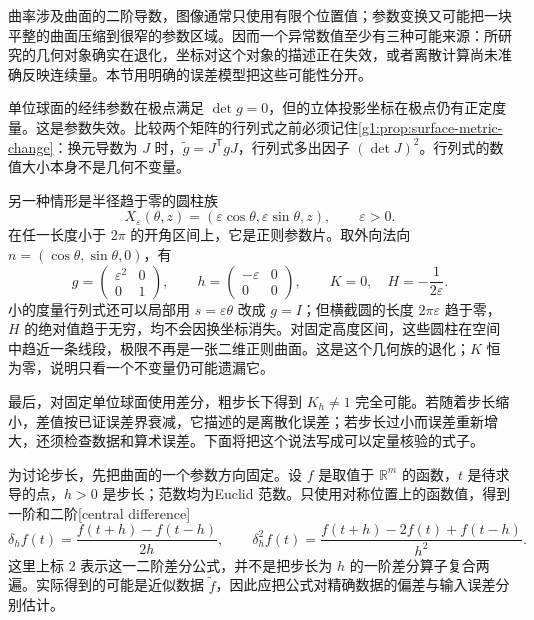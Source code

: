 曲率涉及曲面的二阶导数，图像通常只使用有限个位置值；参数变换又可能把一块平整的曲面压缩到很窄的参数区域。因而一个异常数值至少有三种可能来源：所研究的几何对象确实在退化，坐标对这个对象的描述正在失效，或者离散计算尚未准确反映连续量。本节用明确的误差模型把这些可能性分开。

\begin{example}\label{g1:exm:three-degeneracy-sources}
	单位球面的经纬参数在极点满足 \(\det g=0\)，但的立体投影坐标在极点仍有正定度量。这是参数失效。比较两个矩阵的行列式之前必须记住\cref{g1:prop:surface-metric-change}：换元导数为 \(J\) 时，\(\widetilde g=J^{\mathsf T}gJ\)，行列式多出因子 \((\det J)^2\)。行列式的数值大小本身不是几何不变量。

	另一种情形是半径趋于零的圆柱族
	\[
		X_\varepsilon(\theta,z)=(\varepsilon\cos\theta,\varepsilon\sin\theta,z),
		\qquad \varepsilon>0.
	\]
	在任一长度小于 \(2\pi\) 的开角区间上，它是正则参数片。取外向法向 \(n=(\cos\theta,\sin\theta,0)\)，有
	\[
		g=\begin{pmatrix}\varepsilon^2&0\\0&1\end{pmatrix},\qquad
		h=\begin{pmatrix}-\varepsilon&0\\0&0\end{pmatrix},\qquad
		K=0,\quad H=-\frac1{2\varepsilon}.
	\]
	小的度量行列式还可以局部用 \(s=\varepsilon\theta\) 改成 \(g=I\)；但横截圆的长度 \(2\pi\varepsilon\) 趋于零，\(H\) 的绝对值趋于无穷，均不会因换坐标消失。对固定高度区间，这些圆柱在空间中趋近一条线段，极限不再是一张二维正则曲面。这是这个几何族的退化；\(K\) 恒为零，说明只看一个不变量仍可能遗漏它。

	最后，对固定单位球面使用差分，粗步长下得到 \(K_h\ne1\) 完全可能。若随着步长缩小，差值按已证误差界衰减，它描述的是离散化误差；若步长过小而误差重新增大，还须检查数据和算术误差。下面将把这个说法写成可以定量核验的式子。
\end{example}

为讨论步长，先把曲面的一个参数方向固定。设 \(f\) 是取值于 \(\mathbb R^m\) 的函数，\(t\) 是待求导的点，\(h>0\) 是步长；范数均为Euclid 范数。只使用对称位置上的函数值，得到一阶和二阶[central difference]
\[
	\delta_h f(t)=\frac{f(t+h)-f(t-h)}{2h},\qquad
	\delta_h^2 f(t)=\frac{f(t+h)-2f(t)+f(t-h)}{h^2}.
\]
这里上标 \(2\) 表示这一二阶差分公式，并不是把步长为 \(h\) 的一阶差分算子复合两遍。实际得到的可能是近似数据 \(\widetilde f\)，因此应把公式对精确数据的偏差与输入误差分别估计。

